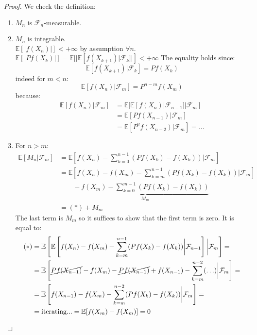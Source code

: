 \documentclass[10pt,a4paper]{article}
\theoremstyle{definition}
\begin{document}
\begin{proof}
We check the definition:
	\begin{enumerate}
		\item $M_n$ is $\mathcal{F}_n$-measurable.
		\item $M_n$ is integrable.\\
		$\mathbb{E}[|f(X_n)|]<+\infty$ by assumption $\forall n$.\\
		$\mathbb{E}[|Pf(X_k)|]=\mathbb{E}[|\mathbb{E}[f(X_{k+1})|\mathcal{F}_k]|]<+\infty$
		The equality holds since:
		\begin{equation*}
			\mathbb{E}[f(X_{k+1})|\mathcal{F}_k]=Pf(X_k)
		\end{equation*}
	indeed for $m<n$:
	\begin{equation*}
		\mathbb{E}[f(X_{n})|\mathcal{F}_m]=P^{n-m}f(X_m)
	\end{equation*}
because:
		\begin{equation*}
			\begin{split}
				\mathbb{E}[f(X_{n})|\mathcal{F}_m]&=\mathbb{E}[\mathbb{E}[f(X_{n})|\mathcal{F}_{n-1}]|\mathcal{F}_m]\\&=\mathbb{E}[Pf(X_{n-1})|\mathcal{F}_m]\\&=\mathbb{E}[P^2f(X_{n-2})|\mathcal{F}_m]=...
			\end{split}		
	\end{equation*}
		\item For $n>m$:
		\begin{equation*}
			\begin{split}
			\mathbb{E}[M_{n}|\mathcal{F}_m]&=\mathbb{E}\left[ f(X_n)-\sum_{k=0}^{n-1}(Pf(X_k)-f(X_k))\bigg|\mathcal{F}_m \right]  \\
			&=\mathbb{E}\left[ f(X_n)-f(X_m)-\sum_{k=m}^{n-1}(Pf(X_k)-f(X_k))\bigg|\mathcal{F}_m \right]\\
			&\qquad +\underbrace{f(X_m)-\sum_{k=0}^{m-1}(Pf(X_k)-f(X_k))}_{M_m}\\
			&=(*)+M_m
			\end{split}		
		\end{equation*}
		The last term is $M_m$ so it suffices to show that the first term is zero. It is equal to:
		\begin{equation*}
			\begin{split}
				(*) &=\mathbb{E}\left[ \mathbb{E}\left[ f(X_n)-f(X_m)-\sum_{k=m}^{n-1}(Pf(X_k)-f(X_k))\bigg|\mathcal{F}_{n-1} \right]  \bigg|\mathcal{F}_m \right]  =\\
				&=\mathbb{E}\left[ \cancel{Pf(X_{n-1})}-f(X_m)-\cancel{Pf(X_{n-1})}+f(X_{n-1})-\sum_{k=m}^{n-2}(\ldots )\bigg|\mathcal{F}_m \right]  =\\
				&=\mathbb{E}\left[ f(X_{n-1})-f(X_m)-\sum_{k=m}^{n-2}(Pf(X_k)-f(X_k))\bigg|\mathcal{F}_m \right]  =\\
				&=\text{iterating...}=\mathbb{E}[f(X_m)-f(X_m)]=0
			\end{split}		
		\end{equation*}
	\end{enumerate}
\end{proof}
\end{document}

